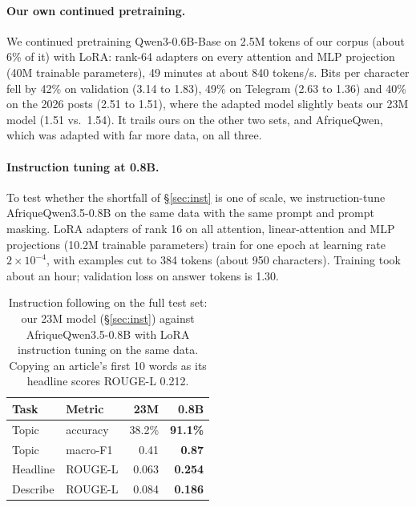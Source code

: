 \documentclass[11pt]{article}
\begin{document}
\paragraph{Our own continued pretraining.} We continued pretraining Qwen3-0.6B-Base on 2.5M tokens of our corpus (about 6\% of it) with LoRA: rank-64 adapters on every attention and MLP projection (40M trainable parameters), 49 minutes at about 840 tokens/s. Bits per character fell by 42\% on validation (3.14 to 1.83), 49\% on Telegram (2.63 to 1.36) and 40\% on the 2026 posts (2.51 to 1.51), where the adapted model slightly beats our 23M model (1.51 vs.\ 1.54). It trails ours on the other two sets, and AfriqueQwen, which was adapted with far more data, on all three.

\paragraph{Instruction tuning at 0.8B.} To test whether the shortfall of \S\ref{sec:inst} is one of scale, we instruction-tune AfriqueQwen3.5-0.8B on the same data with the same prompt and prompt masking. LoRA adapters of rank 16 on all attention, linear-attention and MLP projections (10.2M trainable parameters) train for one epoch at learning rate $2\times10^{-4}$, with examples cut to 384 tokens (about 950 characters). Training took about an hour; validation loss on answer tokens is 1.30.

\begin{table}[t]
\centering
\small
\setlength{\tabcolsep}{3.5pt}
\begin{tabular}{@{}llrr@{}}
\toprule
Task & Metric & 23M & 0.8B \\
\midrule
Topic & accuracy & 38.2\% & \textbf{91.1\%} \\
Topic & macro-F1 & 0.41 & \textbf{0.87} \\
Headline & ROUGE-L & 0.063 & \textbf{0.254} \\
Describe & ROUGE-L & 0.084 & \textbf{0.186} \\
\bottomrule
\end{tabular}
\caption{Instruction following on the full test set: our 23M model (\S\ref{sec:inst}) against AfriqueQwen3.5-0.8B with LoRA instruction tuning on the same data. Copying an article's first 10 words as its headline scores ROUGE-L 0.212.}
\label{tab:inst08}
\end{table}
\end{document}
